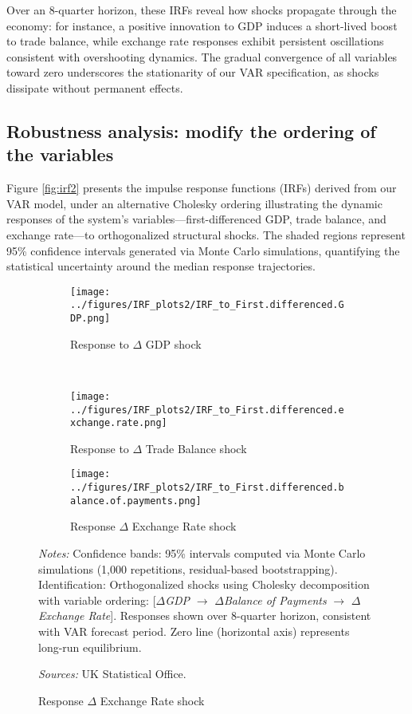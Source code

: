 \documentclass[
]{article}
\begin{document}
	Over an 8-quarter horizon, these IRFs reveal how shocks propagate
	through the economy: for instance, a positive innovation to GDP induces a 
	short-lived boost to trade balance, while exchange rate responses exhibit 
	persistent oscillations consistent with overshooting dynamics. The gradual 
	convergence of all variables toward zero underscores the stationarity of our 
	VAR specification, as shocks dissipate without permanent effects.
	
	\subsection{Robustness analysis: modify the ordering of the variables}
	
	Figure \ref{fig:irf2} presents the impulse response functions (IRFs) derived from our VAR model, 
	under an alternative Cholesky ordering
	illustrating the dynamic responses of the system’s variables—first-differenced GDP, 
	trade balance, and exchange rate—to orthogonalized structural shocks. The 
	shaded regions represent 95\% confidence intervals generated via Monte Carlo 
	simulations, quantifying the statistical uncertainty around the median response
	trajectories. 
	
	\begin{figure}[!htbp]
		\centering
		\caption{\textsc{Impulse Response Functions}}
		\label{fig:irf2}
		
		\begin{subfigure}[b]{0.32\textwidth}
			\centering
			\texttt{[image: ../figures/IRF\_plots2/IRF\_to\_First.differenced.GDP.png]}
			\caption{Response to $\Delta$ GDP shock}
			\label{fig:irf_gdp2}
		\end{subfigure}
		\\
		\begin{subfigure}[b]{0.32\textwidth}
			\centering
			\texttt{[image: ../figures/IRF\_plots2/IRF\_to\_First.differenced.exchange.rate.png]}
			\caption{Response to $\Delta$ Trade Balance shock}
			\label{fig:irf_tb2}
		\end{subfigure}
		\begin{subfigure}[b]{0.32\textwidth}
			\centering
			\texttt{[image: ../figures/IRF\_plots2/IRF\_to\_First.differenced.balance.of.payments.png]}
			\caption{Response $\Delta$ Exchange Rate shock}
			\label{fig:irf_fx2}
		\end{subfigure}
		
		\begin{minipage}{\textwidth}
			\footnotesize
			\textit{Notes:} Confidence bands: 95\% intervals computed via Monte Carlo simulations (1,000 repetitions, residual-based bootstrapping).
			Identification: Orthogonalized shocks using Cholesky decomposition with variable ordering: 
			[$\Delta$\textit{GDP} $\rightarrow$ $\Delta$\textit{Balance of Payments} $\rightarrow$ $\Delta$\textit{Exchange Rate}].
			Responses shown over 8-quarter horizon, 
			consistent with VAR forecast period.
			Zero line (horizontal axis) represents long-run equilibrium.
			
			
			\textit{Sources:} UK Statistical Office.
		\end{minipage}
	\end{figure}
	
\end{document}
